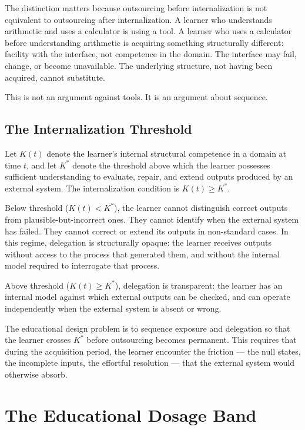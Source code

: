 \documentclass[11pt]{article}
\theoremstyle{remark}
\begin{document}
The distinction matters because outsourcing before internalization is not equivalent to outsourcing after internalization. A learner who understands arithmetic and uses a calculator is using a tool. A learner who uses a calculator before understanding arithmetic is acquiring something structurally different: facility with the interface, not competence in the domain. The interface may fail, change, or become unavailable. The underlying structure, not having been acquired, cannot substitute.

This is not an argument against tools. It is an argument about sequence.

\subsection{The Internalization Threshold}

Let $K(t)$ denote the learner's internal structural competence in a domain at time $t$, and let $K^*$ denote the threshold above which the learner possesses sufficient understanding to evaluate, repair, and extend outputs produced by an external system. The internalization condition is $K(t) \geq K^*$.

Below threshold ($K(t) < K^*$), the learner cannot distinguish correct outputs from plausible-but-incorrect ones. They cannot identify when the external system has failed. They cannot correct or extend its outputs in non-standard cases. In this regime, delegation is structurally opaque: the learner receives outputs without access to the process that generated them, and without the internal model required to interrogate that process.

Above threshold ($K(t) \geq K^*$), delegation is transparent: the learner has an internal model against which external outputs can be checked, and can operate independently when the external system is absent or wrong.

The educational design problem is to sequence exposure and delegation so that the learner crosses $K^*$ before outsourcing becomes permanent. This requires that during the acquisition period, the learner encounter the friction --- the null states, the incomplete inputs, the effortful resolution --- that the external system would otherwise absorb.

\section{The Educational Dosage Band}
\label{sec:dosage_band}
\end{document}
